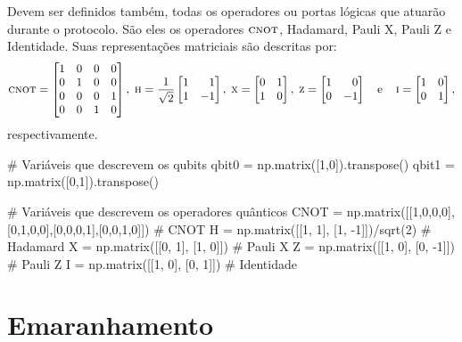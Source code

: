 Devem ser definidos também, todas os operadores ou portas lógicas que atuarão durante o protocolo. São eles os operadores \(\operatorname{\textsc{cnot}}\), Hadamard, Pauli X, Pauli Z e Identidade. Suas representações matriciais são descritas por:
\[ \CNOT =
  \begin{bmatrix}
    1 & 0 & 0 & 0 \\
    0 & 1 & 0 & 0 \\
    0 & 0 & 0 & 1 \\
    0 & 0 & 1 & 0
  \end{bmatrix},\;
  \HAD = \frac{1}{\sqrt{2}} \begin{bmatrix*}[r] 1 & 1 \\ 1 & -1 \end{bmatrix*},\;
  \XXX = \begin{bmatrix} 0 & 1 \\ 1 & 0 \end{bmatrix},\;
  \ZZZ = \begin{bmatrix*}[r] 1 & 0 \\ 0 & -1 \end{bmatrix*} \quad \text{e} \quad
  \III = \begin{bmatrix} 1 & 0 \\ 0 & 1 \end{bmatrix},
\]
respectivamente.

\begin{pycode}
    # Variáveis que descrevem os qubits
    qbit0 = np.matrix([1,0]).transpose()
    qbit1 = np.matrix([0,1]).transpose()

    # Variáveis que descrevem os operadores quânticos
    CNOT = np.matrix([[1,0,0,0],[0,1,0,0],[0,0,0,1],[0,0,1,0]])  # CNOT
    H = np.matrix([[1, 1], [1, -1]])/sqrt(2)  # Hadamard
    X = np.matrix([[0, 1], [1, 0]])           # Pauli X
    Z = np.matrix([[1, 0], [0, -1]])          # Pauli Z
    I = np.matrix([[1, 0], [0, 1]])           # Identidade
\end{pycode}

\section{Emaranhamento}\label{emaranhamento}

